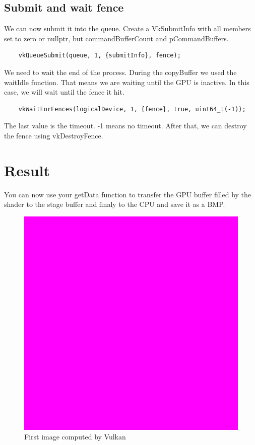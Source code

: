 \documentclass{article}
\begin{document}
\subsection{Submit and wait fence}
We can now submit it into the queue. Create a VkSubmitInfo with all members set to zero or nullptr, but commandBufferCount and pCommandBuffers.
\begin{lstlisting}
	vkQueueSubmit(queue, 1, {submitInfo}, fence);
\end{lstlisting}
We need to wait the end of the process. During the copyBuffer we used the waitIdle function. That means we are waiting until the GPU is inactive. In this case, we will wait until the fence it hit.
\begin{lstlisting}
	vkWaitForFences(logicalDevice, 1, {fence}, true, uint64_t(-1));
\end{lstlisting}
The last value is the timeout. -1 means no timeout.
After that, we can destroy the fence using vkDestroyFence.

\section{Result}
You can now use your getData function to transfer the GPU buffer filled by the shader to the stage buffer and finaly to the CPU and save it as a BMP.
\begin{figure}[h]
	\centering
	\includegraphics[scale=1]{figures/result.png}
	\caption{First image computed by Vulkan}
\end{figure}
\end{document}
